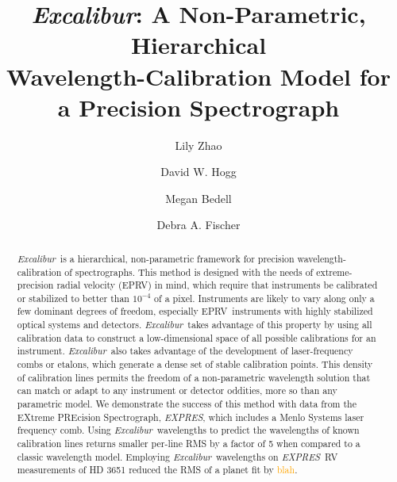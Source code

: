 \documentclass[modern]{aastex63}
\newcommand{\project}[1]{\textsl{#1}}
\newcommand{\name}{\project{Excalibur}}
\newcommand{\acronym}[1]{{\small{#1}}}
\newcommand{\expres}{\project{\acronym{EXPRES}}}
\newcommand{\eprv}{\acronym{EPRV}}
\newcommand{\lz}[1]{\textcolor{orange}{#1}}
\begin{document}
\title{\name:
  A Non-Parametric, Hierarchical \\
  Wavelength-Calibration Model for a Precision Spectrograph}


\author[0000-0002-3852-3590]{Lily Zhao}

\author[0000-0003-2866-9403]{David W. Hogg}

\author[0000-0001-9907-7742]{Megan Bedell}

\author[0000-0003-2221-0861]{Debra A. Fischer}

\begin{abstract}\noindent%
\name\ is a hierarchical, non-parametric framework for precision wavelength-calibration of spectrographs.  This method is designed with the needs of extreme-precision radial velocity (\eprv) in mind, which require that instruments be calibrated or stabilized to better than $10^{-4}$ of a pixel.  Instruments are likely to vary along only a few dominant degrees of freedom, especially \eprv\ instruments with highly stabilized optical systems and detectors.  \name\ takes advantage of this property by using all calibration data to construct a low-dimensional space of all possible calibrations for an instrument.  \name\ also takes advantage of the development of laser-frequency combs or etalons, which generate a dense set of stable calibration points.  This density of calibration lines permits the freedom of a non-parametric wavelength solution that can match or adapt to any instrument or detector oddities, more so than any parametric model.  We demonstrate the success of this method with data from the EXtreme PREcision Spectrograph, \expres, which includes a Menlo Systems laser frequency comb.  Using \name\ wavelengths to predict the wavelengths of known calibration lines returns smaller per-line RMS by a factor of 5 when compared to a classic wavelength model.  Employing \name\ wavelengths on \expres\ RV measurements of HD 3651 reduced the RMS of a planet fit by \lz{blah}.
\end{abstract}
\end{document}
